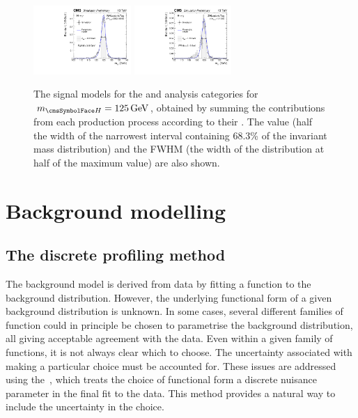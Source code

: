\begin{figure}[ht!]
\includegraphics[width=0.33\textwidth]{modellingFigures/DCBpG/WHLeptonicTag.pdf} 
\includegraphics[width=0.33\textwidth]{modellingFigures/DCBpG/ZHLeptonicTag.pdf} 

\caption{The signal models for the \VBFTag and \TTHTag analysis categories for $\mH=125\GeV$, obtained by summing the contributions from each production process according to their \effxacc. The \effSigma value (half the width of the narrowest interval containing 68.3\% of the invariant mass distribution) and the FWHM (the width of the distribution at half of the maximum value) are also shown.}

\label{fig:model:sig_model_per_category_bis}
\end{figure}




\section{Background modelling}
\label{model:sec:background_model}
\subsection{The discrete profiling method}

The background model is derived from data by fitting a function to the background distribution. However, the underlying functional form of a given background distribution is unknown. In some cases, several different families of function could in principle be chosen to parametrise the background distribution, all giving acceptable agreement with the data. Even within a given family of functions, it is not always clear which to choose. The uncertainty associated with making a particular choice must be accounted for. %
These issues are addressed using the~\cite{DiscreteProfiling}, which treats the choice of functional form a discrete nuisance parameter in the final \NLL fit to the data. This method provides a natural way to include the uncertainty in the choice.

